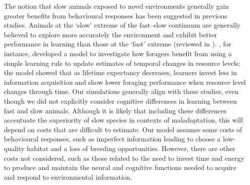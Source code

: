 The notion that slow animals exposed to novel environments
generally gain greater benefits from behavioural responses has
been suggested in previous studies. Animals at the ‘slow’
extreme of the fast–slow continuum are generally believed to
explore more accurately the environment and exhibit better performance
in learning than those at the ‘fast’ extreme (reviewed in \citet{Sol2016}).
\citet{Eliassen2007}, for instance, developed a model to investigate
how foragers benefit from using a simple learning rule to
update estimates of temporal changes in resource levels; the
model showed that as lifetime expectancy decreases, learners
invest less in information acquisition and show lower foraging
performance when resource level changes through time. Our
simulations generally align with these studies, even though we
did not explicitly consider cognitive differences in learning
between fast and slow animals. Although it is likely that including
these differences accentuate the superiority of slow species in
contexts of maladaptation, this will depend on costs that are difficult
to estimate. Our model assumes some costs of behavioural
responses, such as imperfect information leading to choose a
low-quality habitat and a loss of breeding opportunities. However,
there are other costs not considered, such as those related
to the need to invest time and energy to produce and maintain
the neural and cognitive functions needed to acquire and
respond to environmental information.

